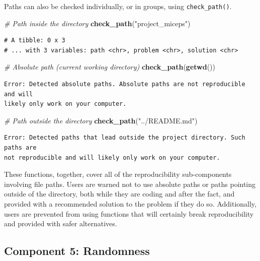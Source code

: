 \documentclass[12pt,twoside]{reedthesis}
\newenvironment{Shaded}{\begin{snugshade}}{\end{snugshade}}
\newcommand{\CommentTok}[1]{\textcolor[rgb]{0.56,0.35,0.01}{\textit{#1}}}
\newcommand{\KeywordTok}[1]{\textcolor[rgb]{0.13,0.29,0.53}{\textbf{#1}}}
\newcommand{\NormalTok}[1]{#1}
\newcommand{\StringTok}[1]{\textcolor[rgb]{0.31,0.60,0.02}{#1}}
\begin{document}
Paths can also be checked individually, or in groups, using \texttt{check\_path()}.
\begin{Shaded}
\begin{Highlighting}[]
\CommentTok{# Path inside the directory}
\KeywordTok{check_path}\NormalTok{(}\StringTok{"project_miceps"}\NormalTok{)}
\end{Highlighting}
\end{Shaded}
\begin{verbatim}
# A tibble: 0 x 3
# ... with 3 variables: path <chr>, problem <chr>, solution <chr>
\end{verbatim}
\begin{Shaded}
\begin{Highlighting}[]
\CommentTok{# Absolute path (current working directory)}
\KeywordTok{check_path}\NormalTok{(}\KeywordTok{getwd}\NormalTok{())}
\end{Highlighting}
\end{Shaded}
\begin{verbatim}
Error: Detected absolute paths. Absolute paths are not reproducible and will
likely only work on your computer.
\end{verbatim}
\begin{Shaded}
\begin{Highlighting}[]
\CommentTok{# Path outside the directory}
\KeywordTok{check_path}\NormalTok{(}\StringTok{"../README.md"}\NormalTok{)}
\end{Highlighting}
\end{Shaded}
\begin{verbatim}
Error: Detected paths that lead outside the project directory. Such paths are
not reproducible and will likely only work on your computer.
\end{verbatim}
These functions, together, cover all of the reproducibility sub-components involving file paths. Users are warned not to use absolute paths or paths pointing outside of the directory, both while they are coding and after the fact, and provided with a recommended solution to the problem if they do so. Additionally, users are prevented from using functions that will certainly break reproducibility and provided with safer alternatives.

\hypertarget{component-5-randomness}{%
\subsection{Component 5: Randomness}\label{component-5-randomness}}
\end{document}
